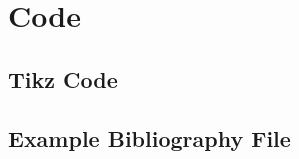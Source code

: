 \chapter{Code}\label{ap:code}

\singlespace
\section{Tikz Code}\label{ap:code-tikz}


\clearpage

\section{Example Bibliography File}\label{ap:code-bib}
